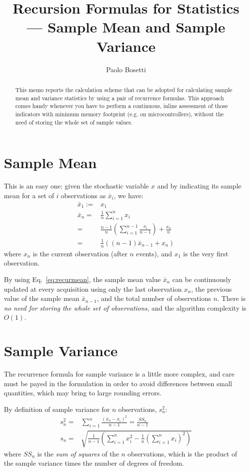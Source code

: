 \documentclass{article}
\title{Recursion Formulas for Statistics --- Sample Mean and Sample Variance}
\author{Paolo Bosetti}
\begin{document}
\maketitle

\begin{abstract}
    This memo reports the calculation scheme that can be adopted for calculating sample mean and variance statistics by using a pair of recurrence formulas. This approach comes handy whenever you have to perform a continuous, inline assessment of those indicators with minimum memory footprint (e.g. on microcontrollers), without the need of storing the whole set of sample values.
\end{abstract}

\newcommand{\inv}[1]{\frac{1}{#1}}
\section{Sample Mean}
This is an easy one: given the stochastic variable $x$ and by indicating its sample mean for a set of $i$ observations as $\bar x_i$, we have:
\begin{eqnarray}
  \bar x_1 :=& x_1 \\
  \bar x_n =& \inv{n}\sum_{i=1}^{n} x_i \\
  =& \frac{n-1}{n} \left(\sum_{i=1}^{n-1}\frac{x_i}{n-1}\right) + \frac{x_n}{n} \\
  =& \inv{n}\left((n-1) \bar x_{n-1} + x_n\right) \label{eq:recurmean}
\end{eqnarray}
where $x_n$ is the current observation (after $n$ events), and $x_1$ is the very first observation.

By using Eq.~\ref{eq:recurmean}, the sample mean value $\bar x_n$ can be continuously updated at every acquisition using only the last observation $x_n$, the previous value of the sample mean $\bar x_{n-1}$, and the total number of observations $n$. There is \emph{no need for storing the whole set of observations}, and the algorithm complexity is $O(1)$.


\section{Sample Variance} %
\label{sec:sample_variance}
The recurrence formula for sample variance is a little more complex, and care must be payed in the formulation in order to avoid differences between small quantities, which may bring to large rounding errors.

By definition of sample variance for $n$ observations, $s_n^2$:
\begin{align}
  s_n^2 =& \sum_{i=1}^{n}\frac{(\bar x_n - x_i)^2}{n-1} = \frac{SS_n}{n-1} \\
  s_n   =& \sqrt{\inv{n-1}\left(\sum_{i=1}^{n}x_i^2 - \inv{n}\left(\sum_{i=1}^{n} x_i\right)^2\right)}
\end{align}
where $SS_n$ is the \emph{sum of squares} of the $n$ observations, which is the product of the sample variance times the number of degrees of freedom.
\end{document}
